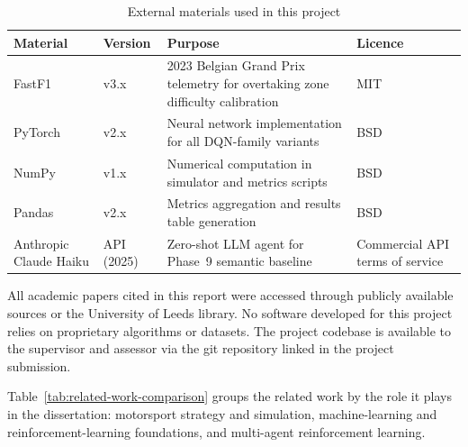 \begin{appendices}
\begin{table}[htbp]
\centering
\small
\caption{External materials used in this project}
\label{tab:external-materials}
\begin{tabular}{|p{3.5cm}|p{2.5cm}|p{5cm}|p{2.5cm}|}
\hline
\textbf{Material} & \textbf{Version} & \textbf{Purpose} & \textbf{Licence} \\
\hline
FastF1 & v3.x & 2023 Belgian Grand Prix telemetry for overtaking zone difficulty calibration & MIT \\
\hline
PyTorch & v2.x & Neural network implementation for all DQN-family variants & BSD \\
\hline
NumPy & v1.x & Numerical computation in simulator and metrics scripts & BSD \\
\hline
Pandas & v2.x & Metrics aggregation and results table generation & BSD \\
\hline
Anthropic Claude Haiku & API (2025) & Zero-shot LLM agent for Phase~9 semantic baseline & Commercial API terms of service \\
\hline
\end{tabular}
\end{table}

All academic papers cited in this report were accessed through publicly available sources or the University of Leeds library. No software developed for this project relies on proprietary algorithms or datasets. The project codebase is available to the supervisor and assessor via the git repository linked in the project submission.

Table~\ref{tab:related-work-comparison} groups the related work by the role it plays in the dissertation: motorsport strategy and simulation, machine-learning and reinforcement-learning foundations, and multi-agent reinforcement learning.


\end{appendices}
